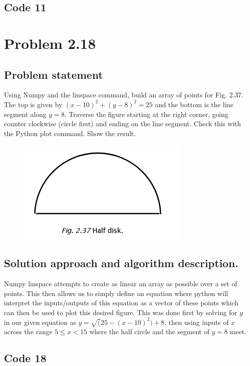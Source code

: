 \documentclass[letterpaper,11pt]{texMemo} %
\begin{document}
\newpage
\subsection*{Code 11}
\begin{tiny}

\end{tiny}

\newpage
\section*{Problem 2.18}
\subsection*{Problem statement}
Using Numpy and the linspace command, build an array of points for Fig. 2.37. The top is given by $(x-10)^2+(y-8)^2=25$
and the bottom is the line segment along $y=8$. Traverse the figure starting at the right corner, going counter clockwise
(circle first) and ending on the line segment. Check this with the Python plot command. Show the result.

\begin{figure}[h]
\centering
\includegraphics{img/fig237.png}
\end{figure}

\subsection*{Solution approach and algorithm description.}
Numpy linspace attempts to create as linear an array as possible over a set of points. This then allows us to simply define 
an equation where python will interpret the inputs/outputs of this equation as a vector of these points which can then be used
to plot this desired figure. This was done first by solving for $y$ in our given equation as $y=\sqrt(25-(x-10)^2)+8$, then using inputs of $x$ across the
range $5 \leq x < 15 $ where the half circle and the segment of $y=8$ meet.

\subsection*{Code 18}
\begin{tiny}

\end{tiny}
\end{document}
